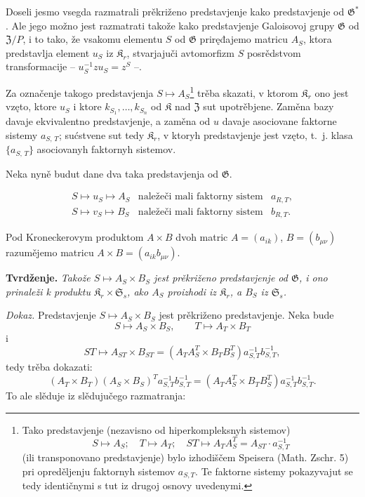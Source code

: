 \documentclass[11pt]{article}
\newcommand{\srcfn}[2]{\footnote{#2}}
\begin{document}
Doseli jesmo vsegda razmatrali prěkriženo predstavjenje kako predstavjenje od \(\mathfrak{G}^*\). Ale jego možno jest razmatrati takože kako predstavjenje Galoisovoj grupy \(\mathfrak{G}\) od \(\mathfrak Z/P\), i to tako, že vsakomu elementu \(S\) od \(\mathfrak{G}\) priręđajemo matricu \(A_S\), ktora predstavlja element \(u_S\) iz \(\mathfrak K_r\), stvarjajuči avtomorfizm \(S\) posrědstvom transformacije -- \(u_S^{-1}zu_S=z^S\) --.

Za označenje takogo predstavjenja \(S\mapsto A_S\)\srcfn{1}{Tako predstavjenje (nezavisno od hiperkompleksnyh sistemov)
\[
S\mapsto A_S;\quad T\mapsto A_T;\quad ST\mapsto A_TA_S^T=A_{ST}\cdot a_{S,T}^{-1}
\]
(ili transponovano predstavjenje) bylo izhodiščem Speisera (Math. Zschr. 5) pri opreděljenju faktornyh sistemov \(a_{S,T}\). Te faktorne sistemy pokazyvajut se tedy identičnymi s tut iz drugoj osnovy uvedenymi.} trěba skazati, v ktorom \(\mathfrak K_r\) ono jest vzęto, ktore \(u_S\) i ktore \(k_{S_1},\ldots,k_{S_n}\) od \(\mathfrak K\) nad \(\mathfrak Z\) sut upotrěbjene. Zaměna bazy davaje ekvivalentno predstavjenje, a zaměna od \(u\) davaje asociovane faktorne sistemy \(a_{S,\,T}\); sućstvene sut tedy \(\mathfrak K_r\), v ktoryh predstavjenje jest vzęto, t.~j. klasa \(\{a_{S,\,T}\}\) asociovanyh faktornyh sistemov.

Neka nyně budut dane dva taka predstavjenja od \(\mathfrak G\).

\[
\begin{array}{lll}
S\mapsto u_S\mapsto A_S & \text{naležeči mali faktorny sistem} & a_{R,T},\\
S\mapsto v_S\mapsto B_S & \text{naležeči mali faktorny sistem} & b_{R,T}.
\end{array}
\]

Pod Kroneckerovym produktom \(A\times B\) dvoh matric \(A=(a_{ik})\), \(B=(b_{\mu\nu})\) razumějemo matricu \(A\times B=(a_{ik}b_{\mu\nu})\).

\noindent\textbf{Tvrdženje.} \emph{Takože \(S\mapsto A_S\times B_S\) jest prěkriženo predstavjenje od \(\mathfrak G\), i ono prinaleži k produktu \(\mathfrak K_r\times\mathfrak S_s\), ako \(A_S\) proizhodi iz \(\mathfrak K_r\), a \(B_S\) iz \(\mathfrak S_s\).}

\noindent\emph{Dokaz.} Predstavjenje \(S\mapsto A_S\times B_S\) jest prěkriženo predstavjenje. Neka bude
\[
S\mapsto A_S\times B_S,\qquad T\mapsto A_T\times B_T
\]
i
\[
ST\mapsto A_{ST}\times B_{ST}
=(A_TA_S^T\times B_TB_S^T)a_{S,T}^{-1}b_{S,T}^{-1},
\]
tedy trěba dokazati:
\[
(A_T\times B_T)(A_S\times B_S)^T a_{S,T}^{-1}b_{S,T}^{-1}
=(A_TA_S^T\times B_TB_S^T)a_{S,T}^{-1}b_{S,T}^{-1}.
\]
To ale slěduje iz slědujučego razmatranja:
\end{document}
